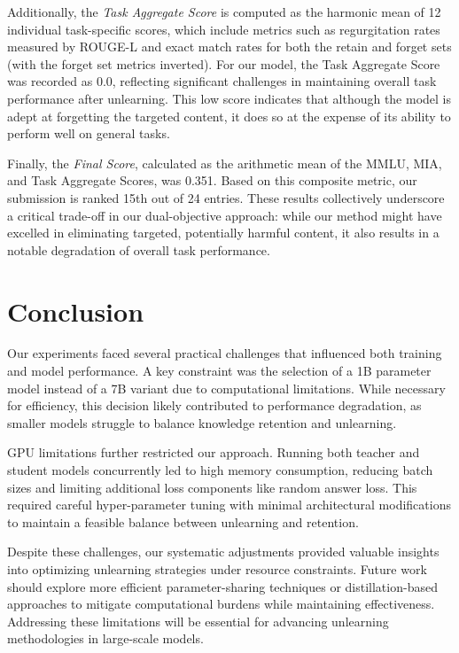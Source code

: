 \documentclass[11pt]{article}
\begin{document}
Additionally, the \textit{Task Aggregate Score} is computed as the harmonic mean of 12 individual task-specific scores, which include metrics such as regurgitation rates measured by ROUGE-L and exact match rates for both the retain and forget sets (with the forget set metrics inverted). For our model, the Task Aggregate Score was recorded as 0.0, reflecting significant challenges in maintaining overall task performance after unlearning. This low score indicates that although the model is adept at forgetting the targeted content, it does so at the expense of its ability to perform well on general tasks.

Finally, the \textit{Final Score}, calculated as the arithmetic mean of the MMLU, MIA, and Task Aggregate Scores, was 0.351. Based on this composite metric, our submission is ranked 15th out of 24 entries. These results collectively underscore a critical trade-off in our dual-objective approach: while our method might have excelled in eliminating targeted, potentially harmful content, it also results in a notable degradation of overall task performance.

\section{Conclusion}
Our experiments faced several practical challenges that influenced both training and model performance. A key constraint was the selection of a 1B parameter model instead of a 7B variant due to computational limitations. While necessary for efficiency, this decision likely contributed to performance degradation, as smaller models struggle to balance knowledge retention and unlearning.  

GPU limitations further restricted our approach. Running both teacher and student models concurrently led to high memory consumption, reducing batch sizes and limiting additional loss components like random answer loss. This required careful hyper-parameter tuning with minimal architectural modifications to maintain a feasible balance between unlearning and retention.   

Despite these challenges, our systematic adjustments provided valuable insights into optimizing unlearning strategies under resource constraints. Future work should explore more efficient parameter-sharing techniques or distillation-based approaches to mitigate computational burdens while maintaining effectiveness. Addressing these limitations will be essential for advancing unlearning methodologies in large-scale models.  
\end{document}
